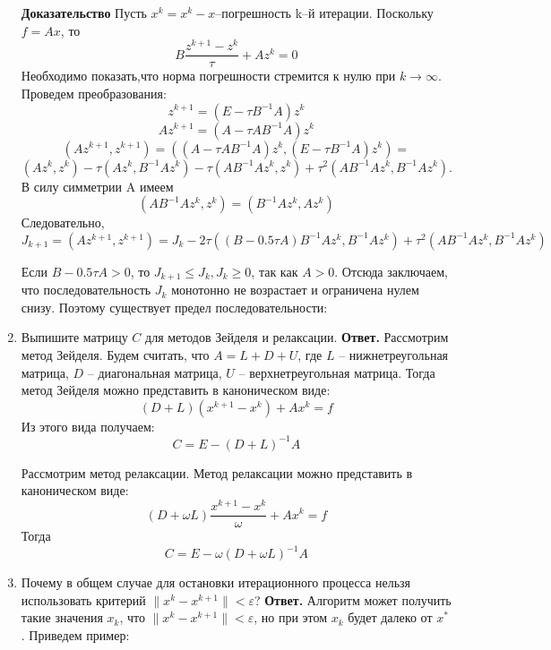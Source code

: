 \documentclass{article}
\begin{document}
\begin{enumerate}
	
	\textbf{Доказательство} Пусть $x^k=x^k-x$--погрешность k--й итерации. Поскольку $f=Ax$, то 
	\[
	B\frac{z^{k+1}-z^k}{\tau} + Az^k = 0
	\]
	Необходимо показать,что норма погрешности стремится к нулю при $k \rightarrow \infty$. Проведем преобразования:
	\[
	z^{k+1}=(E-\tau B^{-1}A)z^k
	\]
	\[
	Az^{k+1}=(A-\tau AB^{-1}A)z^k
	\]
	\[
	(Az^{k+1},z^{k+1})= ((A-\tau AB^{-1}A)z^k, (E-\tau B^{-1}A)z^k)=
	\]
	\[
	(Az^k,z^k)-\tau (Az^k,B^{-1}Az^k) - \tau (AB^{-1}Az^k,z^k) + \tau^2(AB^{-1}Az^k,B^{-1}Az^k).
	\]
	В силу симметрии A имеем 
	\[
	(AB^{-1}Az^k,z^k) = (B^{-1}Az^k, Az^k)
	\]
	Следовательно,
	\[
	J_{k+1}=(Az^{k+1},z^{k+1}) = J_{k} - 2 \tau ((B-0.5 \tau A)B^{-1}Az^k,B^{-1}Az^k) + \tau^2(AB^{-1}Az^k,B^{-1}Az^k)
	\]
	
	
	Если $B-0.5\tau A>0$, то $J_{k+1}\le J_{k}, J_{k} \ge 0$, так как $A>0$. Отсюда заключаем, что последовательность $J_k$ монотонно не возрастает и ограничена нулем снизу. Поэтому существует предел последовательности:

        \item Выпишите матрицу $C$ для методов Зейделя и релаксации.
        \newline
        {\bfseries Ответ.} 
        Рассмотрим метод Зейделя.
        Будем считать, что $A = L + D + U$, где $L$ -- нижнетреугольная матрица, $D$ -- 
        диагональная матрица, $U$ -- верхнетреугольная матрица.
        Тогда метод Зейделя можно представить в каноническом виде: 
        \begin{equation*}
            (D + L)(x^{k+1} -x^k) + Ax^k = f
        \end{equation*}
        Из этого вида получаем:
        \begin{equation*}
            C = E - (D+L)^{-1}A
        \end{equation*}

        Рассмотрим метод релаксации.
        Метод релаксации можно представить в каноническом виде: 
        \begin{equation*}
            (D + \omega L)\frac{x^{k+1} -x^k}{\omega} + Ax^k = f
        \end{equation*}
        Тогда 
        \begin{equation*}
            C = E - \omega(D+\omega L)^{-1}A
        \end{equation*}
        \item Почему в общем случае для остановки итерационного
        процесса нельзя использовать критерий $\|x^k - x^{k+1}\| < \varepsilon$?
        \newline
        {\bfseries Ответ.}
        Алгоритм может получить такие значения $x_k$, что 
        $\|x^k - x^{k+1}\| < \varepsilon$, но при этом $x_k$ будет далеко от $x^*$.
        Приведем пример: 
        

\end{enumerate}
\end{document}
